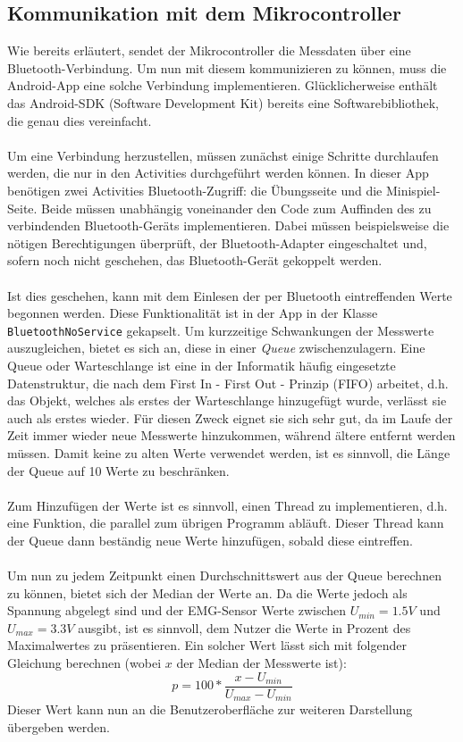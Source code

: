 \subsection{Kommunikation mit dem Mikrocontroller}
Wie bereits erläutert, sendet der Mikrocontroller die Messdaten über eine Bluetooth-Verbindung. Um nun mit  diesem kommunizieren zu können, muss die Android-App eine solche Verbindung implementieren. Glücklicherweise enthält das Android-SDK (Software Development Kit) bereits eine Softwarebibliothek, die genau dies vereinfacht.\cite{Src:AndroidBT} \\ \\
Um eine Verbindung herzustellen, müssen zunächst einige Schritte durchlaufen werden, die nur in den Activities durchgeführt werden können. In dieser App benötigen zwei Activities Bluetooth-Zugriff: die Übungsseite und die Minispiel-Seite. Beide müssen unabhängig voneinander den Code zum Auffinden des zu verbindenden Bluetooth-Geräts implementieren. Dabei müssen beispielsweise die nötigen Berechtigungen überprüft, der Bluetooth-Adapter eingeschaltet und, sofern noch nicht geschehen, das Bluetooth-Gerät gekoppelt werden.\cite{Src:AndroidBT} \\ \\
Ist dies geschehen, kann mit dem Einlesen der per Bluetooth eintreffenden Werte begonnen werden. Diese Funktionalität ist in der App in der Klasse \texttt{BluetoothNoService} gekapselt. Um kurzzeitige Schwankungen der Messwerte auszugleichen, bietet es sich an, diese in einer \textit{Queue} zwischenzulagern. Eine Queue oder Warteschlange ist eine in der Informatik häufig eingesetzte Datenstruktur, die nach dem First In - First Out - Prinzip (FIFO) arbeitet, d.h. das Objekt, welches als erstes der Warteschlange hinzugefügt wurde, verlässt sie auch als erstes wieder. Für diesen Zweck eignet sie sich sehr gut, da im Laufe der Zeit immer wieder neue Messwerte hinzukommen, während ältere entfernt werden müssen. Damit keine zu alten Werte verwendet werden, ist es sinnvoll, die Länge der Queue auf 10 Werte zu beschränken. \\ \\
Zum Hinzufügen der Werte ist es sinnvoll, einen Thread zu implementieren, d.h. eine Funktion, die parallel zum übrigen Programm abläuft. Dieser Thread kann der Queue dann beständig neue Werte hinzufügen, sobald diese eintreffen. \\ \\
Um nun zu jedem Zeitpunkt einen Durchschnittswert aus der Queue berechnen zu können, bietet sich der Median der Werte an. Da die Werte jedoch als Spannung abgelegt sind und der EMG-Sensor Werte zwischen $U_{min} = 1.5 V$ und $U_{max} = 3.3 V$ ausgibt, ist es sinnvoll, dem Nutzer die Werte in Prozent des Maximalwertes zu präsentieren. Ein solcher Wert lässt sich mit folgender Gleichung berechnen (wobei $x$ der Median der Messwerte ist):
\begin{equation*}
p = 100 * \frac{x - U_{min}}{U_{max} - U_{min}}
\end{equation*}
Dieser Wert kann nun an die Benutzeroberfläche zur weiteren Darstellung übergeben werden.
